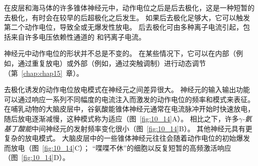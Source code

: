 在皮层和海马体的许多锥体神经元中，动作电位之后是后去极化，这是一种短暂的去极化，有时会在较早的后超极化之后发生。
如果后去极化足够大，它可以触发第二个动作电位，导致全或无爆发性放电。
后去极化可由多种离子电流引起，包括来自许多电压依赖性通道的  和钙离子电流。


神经元中动作电位的形状并不总是不变的。
在某些情况下，它可以在内部（例如，通过重复放电）或外部（例如，通过突触调制）进行动态调节（第~\ref{chap:chap15}~章）。


去极化诱发的动作电位放电模式在神经元之间差异很大。 
神经元的输入输出功能可以通过响应一系列不同幅度的电流注入而激发的动作电位的频率和模式来表征。
在哺乳动物的大脑皮层中，谷氨酸能锥体神经元通常在电流脉冲开始时快速放电，随后放电逐渐减慢，这种模式称为适应（图~\ref{fig:10_14}A）。
相比之下，许多\textit{$\gamma$-氨基丁酸能}中间神经元的发射频率变化很小（图~\ref{fig:10_14}B）。
其他神经元具有更复杂的放电模式。
大脑皮层中的一些锥体神经元往往会随着动作电位的初始爆发而放电（图~\ref{fig:10_14}C）；
“喋喋不休”的细胞以反复短暂的高频激活响应（图~\ref{fig:10_14}D）。


